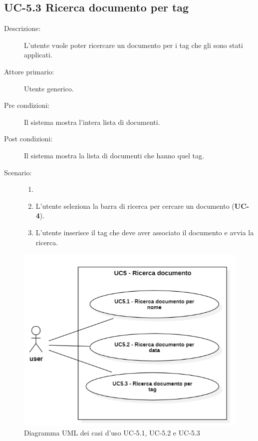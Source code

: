 \subsection{UC-5.3 Ricerca documento per tag}
\begin{description}
    \item[Descrizione:] L’utente vuole poter ricercare un documento per i tag che gli sono stati applicati.
    \item[Attore primario:] Utente generico.
    \item[Pre condizioni:] Il sistema mostra l’intera lista di documenti.
    \item[Post condizioni:] Il sistema mostra la lista di documenti che hanno quel tag.
    \item[Scenario:] 
    \begin{enumerate}
        \item[]
        \item L’utente seleziona la barra di ricerca per cercare un documento (\textbf{UC-4}).
        \item L’utente inserisce il tag che deve aver associato il documento e avvia la ricerca.
    \end{enumerate}
\end{description}

\begin{figure}[H]
    \centering
    \includegraphics[width=0.8\linewidth]{UC5.1.png}
    \caption{Diagramma UML dei casi d'uso UC-5.1, UC-5.2 e UC-5.3}
    \label{fig:UC5.1-2-3}
\end{figure}

